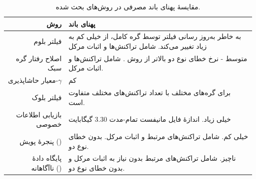 \begin{xltabular}{\textwidth}{|r|X|}
	\caption{
		مقایسهٔ پهنای باند مصرفی در روش‌های بحث شده.
		\label{table:BandWidthCmp}}\\
	\hline
	\textbf{روش} & \textbf{پهنای باند} \\
	\hline 
	{%
		فیلتر بلوم \cite{Hearn2013}
	} & {%
		به خاطر به‌روز رسانی فیلتر توسط گره کامل، از خیلی کم به زیاد تغییر می‌کند. شامل تراکنش‌ها و اثبات مرکل
	} \\
	\hline
	{%
		اصلاح رفتار گره سبک \cite{Gervais2014}
	} & {%
		متوسط - نرخ خطای نوع دو بالاتر از روش \cite{Hearn2013}. شامل تراکنش‌ها و اثبات مرکل.
	}\\
	\hline
	{%
		معیار حاشاپذیری-$\gamma$ \cite{Kanemura2017}
	} & {%
		کم
	}\\
	\hline
	{%
		فیلتر بلوک \cite{Osuntokun2017}
	} & {%
		برای گره‌های مختلف با تعداد تراکنش‌های مختلف متفاوت است.
	}\\
	\hline
	{%
		بازیابی اطلاعات خصوصی \cite{Qin2019}
	} & {%
		خیلی زیاد. اندازهٔ فایل مانیفست تمام-مدت $3.30$ گیگابایت
	}\\
	\hline
	{%
		پنجرهٔ پویش () \cite{Matetic2019}
	} & {%
		خیلی کم. شامل تراکنش‌های مرتبط و اثبات مرکل. بدون خطای نوع دو.
	}\\
	\hline
	{%
		پایگاه دادهٔ ناآگاهانه () \cite{Matetic2019}
	} & {%
		ناچیز. شامل تراکنش‌های مرتبط بدون نیاز به اثبات مرکل و بدون خطای نوع دو.
	}\\
	\hline	
\end{xltabular}

